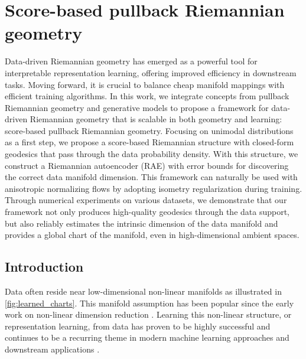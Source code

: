 
\chapter{Score-based pullback Riemannian geometry}\label{Chapter:Pullback-riemannian-geometry}

\ifpdf
    \graphicspath{{Chapter5/Figs/Raster/}{Chapter5/Figs/PDF/}{Chapter5/Figs/}}
\else
    \graphicspath{{Chapter5/Figs/Vector/}{Chapter5/Figs/}}
\fi

Data-driven Riemannian geometry has emerged as a powerful tool for interpretable representation learning, offering improved efficiency in downstream tasks. Moving forward, it is crucial to balance cheap manifold mappings with efficient training algorithms. In this work, we integrate concepts from pullback Riemannian geometry and generative models to propose a framework for data-driven Riemannian geometry that is scalable in both geometry and learning: score-based pullback Riemannian geometry. Focusing on unimodal distributions as a first step, we propose a score-based Riemannian structure with closed-form geodesics that pass through the data probability density. With this structure, we construct a Riemannian autoencoder (RAE) with error bounds for discovering the correct data manifold dimension. This framework can naturally be used with anisotropic normalizing flows by adopting isometry regularization during training. Through numerical experiments on various datasets, we demonstrate that our framework not only produces high-quality geodesics through the data support, but also reliably estimates the intrinsic dimension of the data manifold and provides a global chart of the manifold, even in high-dimensional ambient spaces.

\section{Introduction}

Data often reside near low-dimensional non-linear manifolds as illustrated in \ref{fig:learned_charts}. This manifold assumption \cite{fefferman2016testing} has been popular since the early work on non-linear dimension reduction \cite{belkin2001laplacian,coifman2006diffusion,roweis2000nonlinear,sammon1969nonlinear,tenenbaum2000global}. Learning this non-linear structure, or representation learning, from data has proven to be highly successful \cite{demers1992non,kingma2013auto} and continues to be a recurring theme in modern machine learning approaches and downstream applications \cite{chow2022predicting,gomari2022variational,ternes2022multi,vahdat2020nvae,zhong2021cryodrgn}. 

